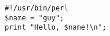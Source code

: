 \documentclass[nofonts]{ctexart}
\begin{document}
\begin{verbatim}
#!/usr/bin/perl
$name = "guy";
print "Hello, $name!\n";
\end{verbatim}
\end{document}
